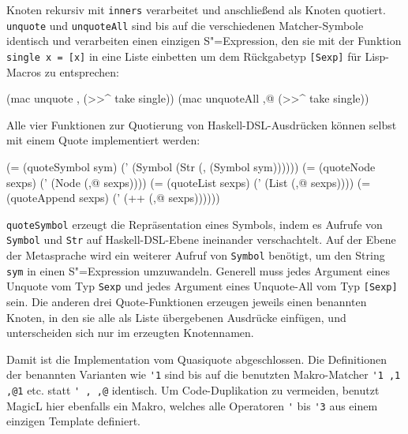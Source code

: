 \documentclass[12pt, a4paper, bibgerm]{scrbook}
\newenvironment{DIFnomarkup}{}{}
\newcommand\icode[1]{\lstinline?#1?}
\newcommand{\sexp}{S"=Expression}
\begin{document}
Knoten rekursiv mit \icode{inners} verarbeitet und anschließend als
Knoten quotiert. \icode{unquote} und \icode{unquoteAll} sind bis auf die
verschiedenen Matcher-Symbole identisch und verarbeiten einen einzigen
\sexp{}, den sie mit der Funktion \icode{single x = [x]} in eine Liste
einbetten um dem Rückgabetyp \icode{[Sexp]} für Lisp-Macros zu
entsprechen:
\begin{DIFnomarkup}\begin{code}
    (mac unquote    ,  (>>^ take single))
    (mac unquoteAll ,@ (>>^ take single))
\end{code}\end{DIFnomarkup}
Alle vier Funktionen zur Quotierung von Haskell-DSL-Ausdrücken
können selbst mit einem Quote implementiert werden:
\begin{DIFnomarkup}\begin{code}
    (= (quoteSymbol sym)
       (' (Symbol (Str (, (Symbol sym))))))
    (= (quoteNode sexps)
       (' (Node (,@ sexps))))
    (= (quoteList sexps)
       (' (List (,@ sexps))))
    (= (quoteAppend sexps)
       (' (++ (,@ sexps))))))
\end{code}\end{DIFnomarkup}
\icode{quoteSymbol} erzeugt die Repräsentation eines Symbols, indem es
Aufrufe von \icode{Symbol} und \icode{Str} auf Haskell-DSL-Ebene
ineinander verschachtelt. Auf der Ebene der Metasprache wird ein
weiterer Aufruf von \icode{Symbol} benötigt, um den String \icode{sym}
in einen \sexp{} umzuwandeln. Generell muss jedes Argument eines Unquote
vom Typ \icode{Sexp} und jedes Argument eines Unquote-All vom Typ
\icode{[Sexp]} sein. Die anderen drei Quote-Funktionen erzeugen jeweils
einen benannten Knoten, in den sie alle als Liste übergebenen Ausdrücke
einfügen, und unterscheiden sich nur im erzeugten Knotennamen.

Damit ist die Implementation vom Quasiquote abgeschlossen. Die
Definitionen der benannten Varianten wie \icode{'1} sind bis auf
die benutzten Makro-Matcher \icode{'1 ,1 ,@1} etc. statt \icode{' , ,@}
identisch. Um Code-Duplikation zu vermeiden, benutzt MagicL hier
ebenfalls ein Makro, welches alle Operatoren \icode{'}
bis \icode{'3} aus einem einzigen Template definiert.
\end{document}
